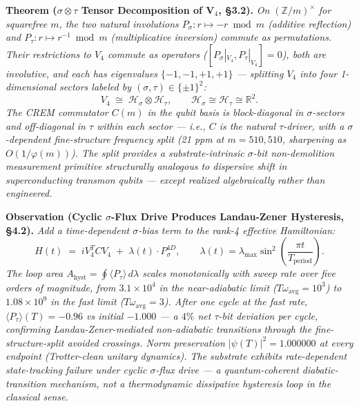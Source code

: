 \documentclass[
]{article}
\begin{document}
\textbf{Theorem (\(\sigma\otimes\tau\) Tensor Decomposition of V\(_4\),
§3.2).} \emph{On \((\mathbb{Z}/m)^\times\) for squarefree \(m\), the two
natural involutions \(P_\sigma : r \mapsto -r \bmod m\) (additive
reflection) and \(P_\tau : r \mapsto r^{-1} \bmod m\) (multiplicative
inversion) commute as permutations. Their restrictions to \(V_4\)
commute as operators (\([P_\sigma|_{V_4}, P_\tau|_{V_4}] = 0\)), both
are involutive, and each has eigenvalues \(\{-1, -1, +1, +1\}\) ---
splitting \(V_4\) into four 1-dimensional sectors labeled by
\((\sigma, \tau) \in \{\pm 1\}^2\):}
\[V_4 \;\cong\; \mathcal{H}_\sigma \otimes \mathcal{H}_\tau, \qquad \mathcal{H}_\sigma \cong \mathcal{H}_\tau \cong \mathbb{R}^2.\]
\emph{The CREM commutator \(C(m)\) in the qubit basis is block-diagonal
in \(\sigma\)-sectors and off-diagonal in \(\tau\) within each sector
--- i.e., \(C\) is the natural \(\tau\)-driver, with a
\(\sigma\)-dependent fine-structure frequency split (21 ppm at
\(m = 510{,}510\), sharpening as \(O(1/\varphi(m))\)). The split
provides a substrate-intrinsic \(\sigma\)-bit non-demolition measurement
primitive structurally analogous to dispersive shift in superconducting
transmon qubits --- except realized algebraically rather than
engineered.}

\textbf{Observation (Cyclic \(\sigma\)-Flux Drive Produces Landau-Zener
Hysteresis, §4.2).} \emph{Add a time-dependent \(\sigma\)-bias term to
the rank-4 effective Hamiltonian:}
\[H(t) \;=\; i V_4^T C V_4 \;+\; \lambda(t) \cdot P_\sigma^{4D}, \qquad \lambda(t) = \lambda_\text{max} \sin^2\!\left(\frac{\pi t}{T_\text{period}}\right).\]
\emph{The loop area
\(A_\text{hyst} = \oint \langle P_\tau \rangle\, d\lambda\) scales
monotonically with sweep rate over five orders of magnitude, from
\(3.1 \times 10^4\) in the near-adiabatic limit
(\(T \omega_\text{avg} = 10^3\)) to \(1.08 \times 10^9\) in the fast
limit (\(T \omega_\text{avg} = 3\)). After one cycle at the fast rate,
\(\langle P_\tau\rangle(T) = -0.96\) vs initial \(-1.000\) --- a \(4\%\)
net \(\tau\)-bit deviation per cycle, confirming Landau-Zener-mediated
non-adiabatic transitions through the fine-structure-split avoided
crossings. Norm preservation \(|\psi(T)|^2 = 1.000000\) at every
endpoint (Trotter-clean unitary dynamics). The substrate exhibits
rate-dependent state-tracking failure under cyclic \(\sigma\)-flux drive
--- a quantum-coherent diabatic-transition mechanism, not a
thermodynamic dissipative hysteresis loop in the classical sense.}
\end{document}
